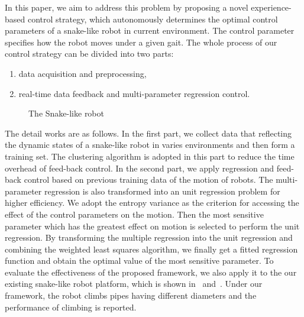 In this paper, we aim to address this problem by proposing a novel experience-based control strategy,
which autonomously determines the optimal control parameters of a snake-like robot in
current environment. The control parameter specifies how the robot moves under a given
gait. The whole process of our control strategy can be divided into two parts:
\begin{enumerate}
	\item data acquisition and preprocessing,
	\item real-time data feedback and multi-parameter regression control.
\end{enumerate}
\begin{figure}[!t]
	\centering
	\caption{The Snake-like robot}
\end{figure}

The detail works are as follows. In the first part, we collect data that reflecting the dynamic states of a snake-like
robot in varies environments and then form a training set. The clustering
algorithm\cite{Cluseter_ICT}\cite{KmeansAndDeepLearning}
is adopted in this part to reduce the time overhead of feed-back control.
In the second part, we apply regression and feed-back control based on previous
training data of the motion of robots. The multi-parameter regression
is also transformed into an unit regression problem for higher efficiency.
We adopt the entropy
variance\cite{WaveformEntropyVariance}\cite{EntropyandVarianceasRiskMeasure}\cite{UsingEntropyAndVariance}
as the criterion for accessing the effect of the control parameters on the motion.
Then the most sensitive parameter which has the greatest effect on motion is selected
to perform the unit regression. By transforming the multiple regression into the 
unit regression and combining the weighted least squares algorithm\cite{gradientMethod}\cite{MSEestimates}, 
we finally get a fitted regression function and obtain the optimal value of the most sensitive parameter.
To evaluate the effectiveness of the proposed framework, we also apply it to the our 
existing snake-like robot platform, which is shown in~
and~. Under our framework, the robot climbs pipes having different diameters and the
performance of climbing is reported. 

